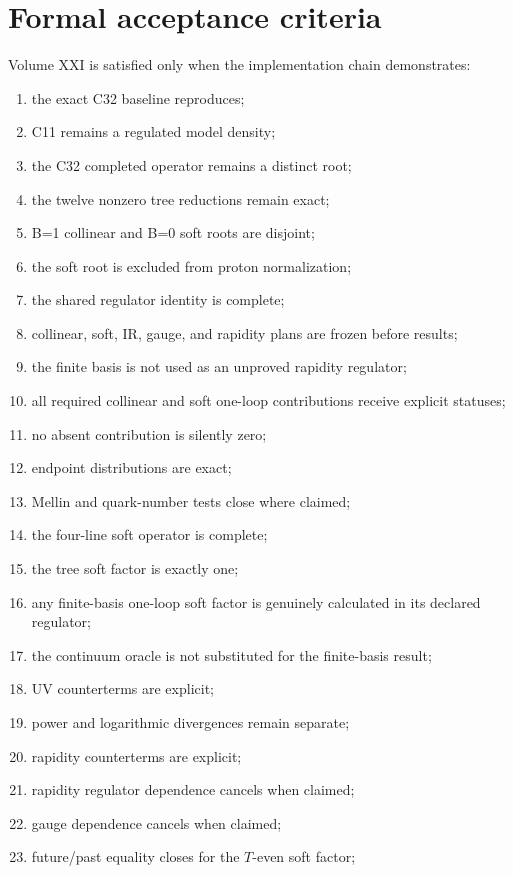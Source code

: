 \documentclass[11pt]{article}
\begin{document}
\section{Formal acceptance criteria}
\label{sec:acceptance}

Volume XXI is satisfied only when the implementation chain demonstrates:

\begin{enumerate}
\item the exact C32 baseline reproduces;
\item C11 remains a regulated model density;
\item the C32 completed operator remains a distinct root;
\item the twelve nonzero tree reductions remain exact;
\item B=1 collinear and B=0 soft roots are disjoint;
\item the soft root is excluded from proton normalization;
\item the shared regulator identity is complete;
\item collinear, soft, IR, gauge, and rapidity plans are frozen before results;
\item the finite basis is not used as an unproved rapidity regulator;
\item all required collinear and soft one-loop contributions receive explicit statuses;
\item no absent contribution is silently zero;
\item endpoint distributions are exact;
\item Mellin and quark-number tests close where claimed;
\item the four-line soft operator is complete;
\item the tree soft factor is exactly one;
\item any finite-basis one-loop soft factor is genuinely calculated in its declared regulator;
\item the continuum oracle is not substituted for the finite-basis result;
\item UV counterterms are explicit;
\item power and logarithmic divergences remain separate;
\item rapidity counterterms are explicit;
\item rapidity regulator dependence cancels when claimed;
\item gauge dependence cancels when claimed;
\item future/past equality closes for the \(T\)-even soft factor;

\end{enumerate}
\end{document}
